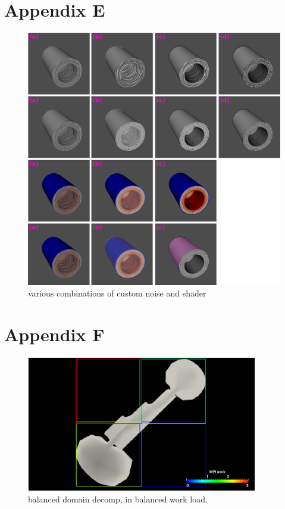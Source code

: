 \documentclass[a4paper,10pt]{article}
\begin{document}
\section{Appendix E}
\begin{figure}[ht]
 \centering
 \includegraphics[width=\textwidth]{./images-data/dia-serial/various-noise-shader.png}
 \caption{various combinations of custom noise and shader}
 \label{fig:various}
\end{figure}

\section{Appendix F}
\begin{figure}[ht]
 \centering
 \includegraphics[width=0.9\textwidth]{./images-data/dia-serial/ex-blow-balanced-screen-exts-guard-pixels-ddepth-all.png}
 \caption{balanced domain decomp, in balanced work load.}
 \label{fig:balanced-bad}
\end{figure}
\end{document}

